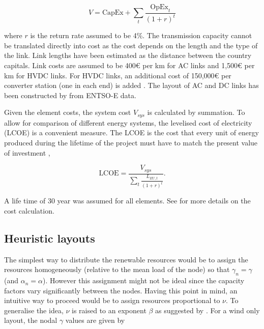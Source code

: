 \documentclass[a4paper, 5p, sort&compress]{elsarticle}%
\newcommand{\paren}[1]{\left(#1\right)}
\begin{document}
\begin{equation}
  \label{eq:6}
  V = \text{CapEx} + \sum_{t} \frac{\text{OpEx}_{t}}{\paren{1 + r}^{t}}
\end{equation}

where $r$ is the return rate assumed to be 4\%. The transmission
capacity cannot be translated directly into cost as the cost depends
on the length and the type of the link. Link lengths have been
estimated as the distance between the country capitals. Link costs are
assumed to be 400\euro{}
per km for AC links and 1,500\euro{}
per km for HVDC links. For HVDC links, an additional cost of
150,000\euro{}
per converter station (one in each end) is
added \cite{McKinsey, Schaber, Schaber2}. The layout of AC and
DC links has been constructed by \cite{rolando2014} from ENTSO-E data.


Given the element costs, the system cost $V_{sys}$ is calculated by
summation. To allow for comparison of different energy systems, the
levelised cost of electricity (LCOE) is a convenient measure. The LCOE
is the cost that every unit of energy produced during the lifetime of
the project must have to match the present value of
investment \cite{Short1995},

\begin{equation}
  \label{eq:7}
  \text{LCOE} = \frac{V_{sys}}{\sum_{t} \frac{L_{EU,
        t}}{\paren{1+r}^{t}}} .
\end{equation}

A life time of 30 year was assumed for all elements. See
\cite{Sensitivity} for more details on the cost calculation.

\subsection{Heuristic layouts}
\label{sec:heuristic-layouts}

The simplest way to distribute the renewable resources would be to
assign the resources homogeneously (relative to the mean load of the
node) so that $\gamma_{n} = \gamma$ (and $\alpha_{n} = \alpha$). However this assignment
might not be ideal since the capacity factors vary significantly
between the nodes. Having this point in mind, an intuitive way to
proceed would be to assign resources proportional to $\nu$. To
generalise the idea, $\nu$ is raised to an exponent $\beta$ as suggested by
\cite{Rolando}. For a wind only layout, the nodal $\gamma$ values are given by
\end{document}
